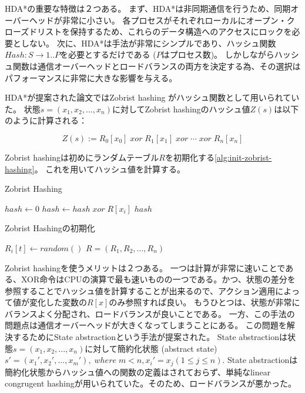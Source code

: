 HDA*の重要な特徴は２つある。
まず、HDA*は非同期通信を行うため、同期オーバーヘッドが非常に小さい。
各プロセスがそれぞれローカルにオープン・クローズドリストを保持するため、これらのデータ構造へのアクセスにロックを必要としない。
次に、HDA*は手法が非常にシンプルであり、ハッシュ関数$Hash: S \rightarrow {1..P}$を必要とするだけである ($P$はプロセス数)。
しかしながらハッシュ関数は通信オーバーヘッドとロードバランスの両方を決定する為、その選択はパフォーマンスに非常に大きな影響を与える。

HDA*が提案された論文\cite{kishimotofb13}ではZobrist hashing \cite{zobrist:70}がハッシュ関数として用いられていた。
状態$s = (x_1,x_2,...,x_n)$に対してZobrist hashingのハッシュ値$Z(s)$は以下のように計算される：

\begin{equation}
\label{eq:zobrist}
 	Z(s) := R_{0}[x_{0}]\; xor\; R_{1}[x_{1}]\; xor\; \cdots\; xor\; R_{n}[x_{n}]%
\end{equation}

Zobrist hashingは初めにランダムテーブル$R$を初期化する\ref{alg:init-zobrist-hashing}。
これを用いてハッシュ値を計算する。

\begin{algorithm}
	\caption{Zobrist Hashing}
	$hash \leftarrow 0$\;
	 {
		$hash \leftarrow hash \; xor \; R[x_i]$\;
	}
	\Return $hash$\;
	\label{alg:zobrist-hashing}
\end{algorithm}

\begin{algorithm}
	\caption{Zobrist Hashingの初期化}
	 {
		 {
			$R_i[t] \leftarrow random()$\;
		}
	}
	\Return $R = (R_1, R_2,...,R_n)$
	\label{alg:init-zobrist-hashing}
\end{algorithm}

Zobrist hashingを使うメリットは２つある。
一つは計算が非常に速いことである、XOR命令はCPUの演算で最も速いものの一つである。かつ、状態の差分を参照することでハッシュ値を計算することが出来るので、アクション適用によって値が変化した変数の$R[x]$のみ参照すれば良い。
もうひとつは、状態が非常にバランスよく分配され、ロードバランスが良いことである。
一方、この手法の問題点は通信オーバーヘッドが大きくなってしまうことにある。
この問題を解決するためにState abstractionという手法が提案された\cite{burnslrz10}。
State abstractionは状態$s = (x_1,x_2,...,x_n)$に対して簡約化状態 (abstract state) $s' = (x_1',x_2',...,x_m'), \; where \; m < n, x_i' = x_j (1 \leq j \leq n)$. %
State abstractionは簡約化状態からハッシュ値への関数の定義はされておらず、単純なlinear congrugent hashingが用いられていた。そのため、ロードバランスが悪かった。

